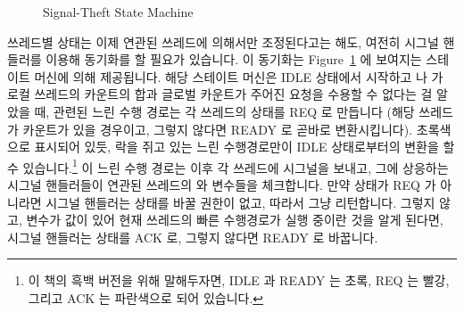 \begin{figure}[tb]
\centering
{}
\caption{Signal-Theft State Machine}
\label{fig:count:Signal-Theft State Machine}
\end{figure}

쓰레드별 상태는 이제 연관된 쓰레드에 의해서만 조정된다고는 해도, 여전히 시그널
핸들러를 이용해 동기화를 할 필요가 있습니다.
이 동기화는 Figure~\ref{fig:count:Signal-Theft State Machine} 에 보여지는
스테이트 머신에 의해 제공됩니다.
해당 스테이트 머신은 IDLE 상태에서 시작하고  나
 가 로컬 쓰레드의 카운트의 합과 글로벌 카운트가 주어진 요청을
수용할 수 없다는 걸 알았을 때, 관련된 느린 수행 경로는 각 쓰레드의 
상태를 REQ 로 만듭니다 (해당 쓰레드가 카운트가 있을 경우이고, 그렇지 않다면
READY 로 곧바로 변환시킵니다).
초록색으로 표시되어 있듯,  락을 쥐고 있는 느린 수행경로만이
IDLE 상태로부터의 변환을 할 수 있습니다.\footnote{
	이 책의 흑백 버전을 위해 말해두자면, IDLE 과 READY 는 초록, REQ 는
	빨강, 그리고 ACK 는 파란색으로 되어 있습니다.}
이 느린 수행 경로는 이후 각 쓰레드에 시그널을 보내고, 그에 상응하는 시그널
핸들러들이 연관된 쓰레드의  와  변수들을 체크합니다.
만약  상태가 REQ 가 아니라면 시그널 핸들러는 상태를 바꿀 권한이 없고,
따라서 그냥 리턴합니다.
그렇지 않고,  변수가 값이 있어 현재 쓰레드의 빠른 수행경로가 실행
중이란 것을 알게 된다면, 시그널 핸들러는  상태를 ACK 로, 그렇지
않다면 READY 로 바꿉니다.
\iffalse


